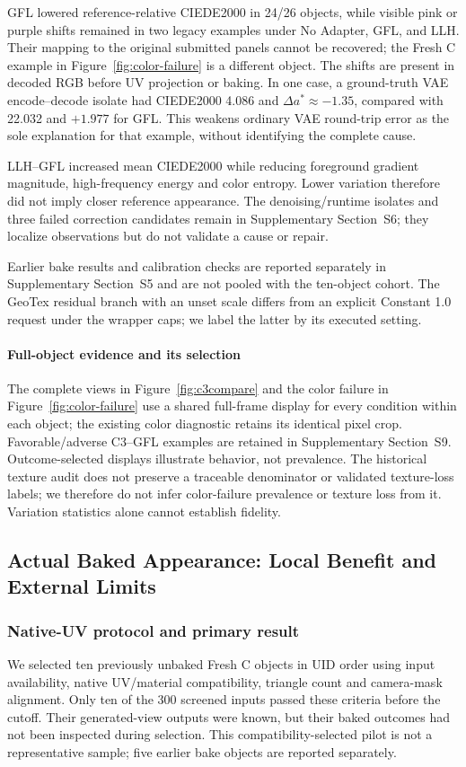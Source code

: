\documentclass[times,twocolumn,final]{elsarticle}
\begin{document}
GFL lowered reference-relative CIEDE2000 in 24/26 objects, while visible pink or purple shifts remained in two legacy examples under No Adapter, GFL, and LLH. Their mapping to the original submitted panels cannot be recovered; the Fresh C example in Figure~\ref{fig:color-failure} is a different object. The shifts are present in decoded RGB before UV projection or baking. In one case, a ground-truth VAE encode--decode isolate had CIEDE2000 4.086 and $\Delta a^*\approx-1.35$, compared with 22.032 and $+1.977$ for GFL. This weakens ordinary VAE round-trip error as the sole explanation for that example, without identifying the complete cause.

LLH--GFL increased mean CIEDE2000 while reducing foreground gradient magnitude, high-frequency energy and color entropy. Lower variation therefore did not imply closer reference appearance. The denoising/runtime isolates and three failed correction candidates remain in Supplementary Section~S6; they localize observations but do not validate a cause or repair.

Earlier bake results and calibration checks are reported separately in Supplementary Section~S5 and are not pooled with the ten-object cohort. The GeoTex residual branch with an unset scale differs from an explicit Constant 1.0 request under the wrapper caps; we label the latter by its executed setting.

\paragraph{Full-object evidence and its selection}
The complete views in Figure~\ref{fig:c3compare} and the color failure in Figure~\ref{fig:color-failure} use a shared full-frame display for every condition within each object; the existing color diagnostic retains its identical pixel crop. Favorable/adverse C3--GFL examples are retained in Supplementary Section~S9. Outcome-selected displays illustrate behavior, not prevalence. The historical texture audit does not preserve a traceable denominator or validated texture-loss labels; we therefore do not infer color-failure prevalence or texture loss from it. Variation statistics alone cannot establish fidelity.


\subsection{Actual Baked Appearance: Local Benefit and External Limits}
\label{subsec:new-bake}
\subsubsection{Native-UV protocol and primary result}
We selected ten previously unbaked Fresh C objects in UID order using input availability, native UV/material compatibility, triangle count and camera-mask alignment. Only ten of the 300 screened inputs passed these criteria before the cutoff. Their generated-view outputs were known, but their baked outcomes had not been inspected during selection. This compatibility-selected pilot is not a representative sample; five earlier bake objects are reported separately.
\end{document}
